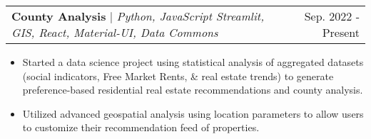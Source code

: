 \documentclass[letterpaper,11pt]{article}
\makeatletter
\newcommand{\resumeItem}[1]{
  \item\small{
    {#1 \vspace{-2pt}}
  }
}
\newcommand{\resumeProjectHeading}[2]{
    \item
    \begin{tabular*}{0.97\textwidth}{l@{\extracolsep{\fill}}r}
      \small#1 & #2 \\
    \end{tabular*}\vspace{-7pt}
}
\newcommand{\resumeItemListStart}{\begin{itemize}}
\newcommand{\resumeItemListEnd}{\end{itemize}\vspace{-5pt}}
\makeatother
\begin{document}

            

         \resumeProjectHeading
              {\textbf{County Analysis} $|$ \emph{Python, JavaScript Streamlit, GIS, React, Material-UI, Data Commons}}{Sep. 2022 - Present}
              \resumeItemListStart
                \resumeItem{Started a data science project using statistical analysis of aggregated datasets (social indicators, Free Market Rents, \& real estate trends) to generate preference-based residential real estate recommendations and county analysis.}
                \resumeItem{Utilized advanced geospatial analysis using location parameters to allow users to customize their recommendation feed of properties.}
              \resumeItemListEnd
\end{document}
